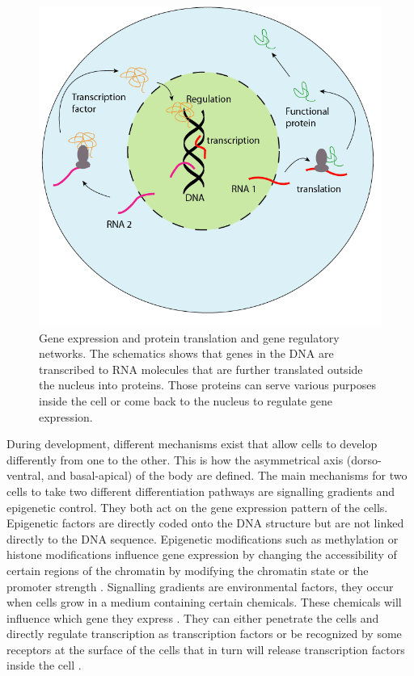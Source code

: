 	
\begin{figure}[bth]
\begin{center}
  \includegraphics[width=0.8\linewidth]{gfx/chapter1/cell.png}
\end{center}
  \caption{Gene expression and protein translation and gene regulatory networks. The schematics shows that genes in the DNA are transcribed to RNA molecules that are further translated outside the nucleus into proteins. Those proteins can serve various purposes inside the cell or come back to the nucleus to regulate gene expression.}
  \label{fig:cells}
\end{figure}
	
	
	
	During development, different mechanisms exist that allow cells to develop differently from one to the other. This is how the asymmetrical axis (dorso-ventral, and basal-apical) of the body are defined. The main mechanisms for two cells to take two different differentiation pathways are signalling gradients and epigenetic control. They both act on the gene expression pattern of the cells. Epigenetic factors are directly coded onto the DNA structure but are not linked directly to the DNA sequence. Epigenetic modifications such as methylation or histone modifications influence gene expression by changing the accessibility of certain regions of the chromatin by modifying the chromatin state or the promoter strength \citep{jaenisch03}. Signalling gradients are environmental factors, they occur when cells grow in a medium containing certain chemicals. These chemicals will influence which gene they express \citep{chang02}. They can either penetrate the cells and directly regulate transcription as transcription factors \citep{durston89} or be recognized by some receptors at the surface of the cells that in turn will release transcription factors inside the cell \citep{wang92}. \\
	
